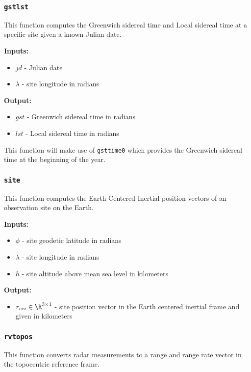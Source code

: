 \documentclass[11pt, reqno]{article}    %
\begin{document}
\subsubsection*{\texttt{gstlst}}

This function computes the Greenwich sidereal time and Local sidereal time at a specific site given a known Julian date.

\noindent \textbf{Inputs: }
\begin{itemize}
    \item \( jd \) - Julian date
    \item \( \lambda \) - site longitude in radians
\end{itemize}

\noindent \textbf{Output:}
\begin{itemize}
    \item \(gst \) - Greenwich sidereal time in radians
    \item \(lst\) - Local sidereal time in radians
\end{itemize}

This function will make use of \texttt{gsttime0} which provides the Greenwich sidereal time at the beginning of the year. 

\subsubsection*{\texttt{site}}
This function computes the Earth Centered Inertial position vectors of an observation site on the Earth.

\noindent \textbf{Inputs: }
\begin{itemize}
    \item \( \phi \) - site geodetic latitude in radians
    \item \( \lambda \) - site longitude in radians
    \item \( h \) - site altitude above mean sea level in kilometers
\end{itemize}

\noindent \textbf{Output:}
\begin{itemize}
    \item \( r_{eci} \in \R^{3 \times 1} \) - site position vector in the Earth centered inertial frame and given in kilometers
\end{itemize}

\subsubsection*{\texttt{rvtopos}}
This function converts radar measurements to a range and range rate vector in the topocentric reference frame.
\end{document}
